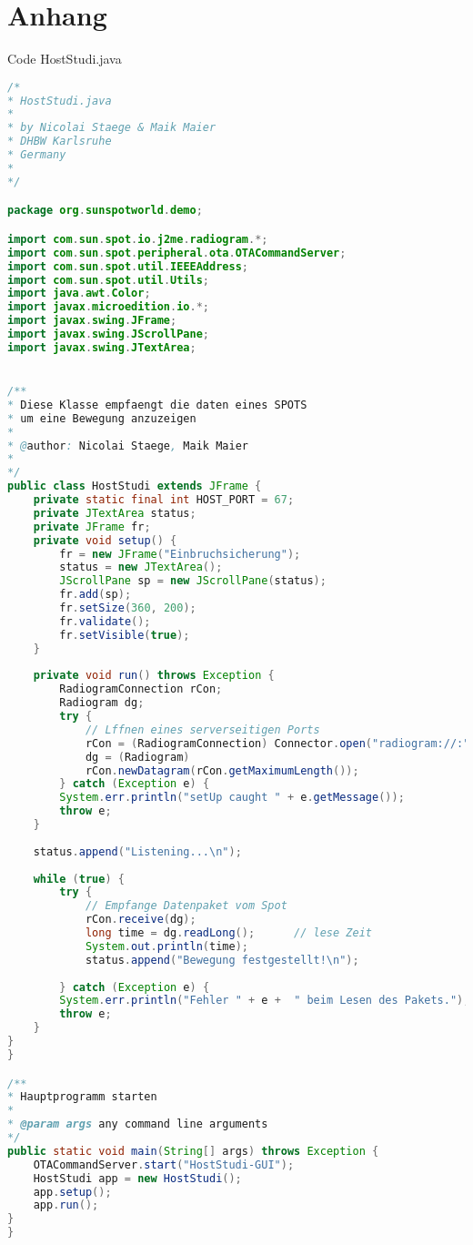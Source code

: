 \chapter*{Anhang}

{\huge Code HostStudi.java}

\begin{lstlisting}[language=Java,caption={Code HostStudi.java},label=lst:hoststudi,frame=single]
/*
* HostStudi.java
*
* by Nicolai Staege & Maik Maier
* DHBW Karlsruhe
* Germany
*
*/

package org.sunspotworld.demo;

import com.sun.spot.io.j2me.radiogram.*;
import com.sun.spot.peripheral.ota.OTACommandServer;
import com.sun.spot.util.IEEEAddress;
import com.sun.spot.util.Utils;
import java.awt.Color;
import javax.microedition.io.*;
import javax.swing.JFrame;
import javax.swing.JScrollPane;
import javax.swing.JTextArea;


/**
* Diese Klasse empfaengt die daten eines SPOTS
* um eine Bewegung anzuzeigen
* 
* @author: Nicolai Staege, Maik Maier
* 
*/
public class HostStudi extends JFrame {
	private static final int HOST_PORT = 67;
	private JTextArea status;
	private JFrame fr;
	private void setup() {
		fr = new JFrame("Einbruchsicherung");
		status = new JTextArea();
		JScrollPane sp = new JScrollPane(status);
		fr.add(sp);
		fr.setSize(360, 200);
		fr.validate();
		fr.setVisible(true);
	}
	
	private void run() throws Exception {
		RadiogramConnection rCon;
		Radiogram dg;
		try {
			// Lffnen eines serverseitigen Ports
			rCon = (RadiogramConnection) Connector.open("radiogram://:" + HOST_PORT);
			dg = (Radiogram)
			rCon.newDatagram(rCon.getMaximumLength());
		} catch (Exception e) {
		System.err.println("setUp caught " + e.getMessage());
		throw e;
	}
	
	status.append("Listening...\n");
	
	while (true) {
		try {
			// Empfange Datenpaket vom Spot
			rCon.receive(dg);
			long time = dg.readLong();      // lese Zeit
			System.out.println(time);
			status.append("Bewegung festgestellt!\n");
			
		} catch (Exception e) {
		System.err.println("Fehler " + e +  " beim Lesen des Pakets.");
		throw e;
	}
}
}

/**
* Hauptprogramm starten
*
* @param args any command line arguments
*/
public static void main(String[] args) throws Exception {
	OTACommandServer.start("HostStudi-GUI");
	HostStudi app = new HostStudi();
	app.setup();
	app.run();
}
}

\end{lstlisting}
\newpage

